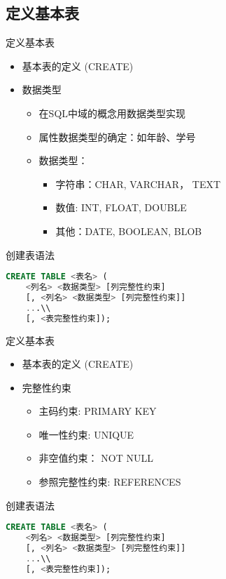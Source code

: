 \subsection{定义基本表}
\begin{frame}[fragile]{定义基本表}
\begin{itemize}
    \item 基本表的定义 (CREATE)
    \item 数据类型
    \begin{itemize}
        \item 在SQL中域的概念用数据类型实现
        \item 属性数据类型的确定：如年龄、学号
        \item 数据类型：
            \begin{itemize}
                \item 字符串：CHAR, VARCHAR， TEXT
                \item 数值: INT, FLOAT, DOUBLE
                \item 其他：DATE, BOOLEAN, BLOB
            \end{itemize}
    \end{itemize}
\end{itemize}
\begin{block}{创建表语法}
\begin{lstlisting}[language=SQL]
CREATE TABLE <表名> ( 
    <列名> <数据类型> [列完整性约束] 
    [, <列名> <数据类型> [列完整性约束]]
    ...\\
    [, <表完整性约束]);
\end{lstlisting}
\end{block}
\end{frame}

\begin{frame}[fragile]{定义基本表}
\begin{itemize}
    \item 基本表的定义 (CREATE)
    \item 完整性约束
    \begin{itemize}
        \item 主码约束: PRIMARY KEY
        \item 唯一性约束: UNIQUE
        \item 非空值约束： NOT NULL
        \item 参照完整性约束: REFERENCES
    \end{itemize}
\end{itemize}
\begin{block}{创建表语法}
\begin{lstlisting}[language=SQL]
CREATE TABLE <表名> ( 
    <列名> <数据类型> [列完整性约束] 
    [, <列名> <数据类型> [列完整性约束]]
    ...\\
    [, <表完整性约束]);
\end{lstlisting}
\end{block}
\end{frame}



